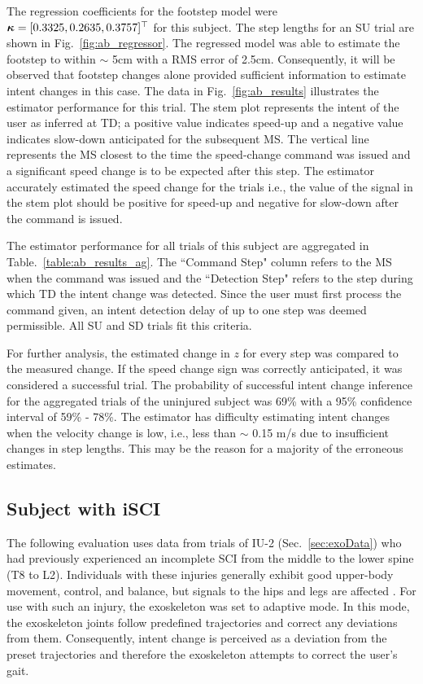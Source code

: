 The regression coefficients for the footstep model were $ \boldsymbol{\kappa} = [0.3325 ,0.2635 ,0.3757]^{\top} $ for this subject. The step lengths for an SU trial are shown in Fig.~\ref{fig:ab_regressor}. The regressed model was able to estimate the footstep to within $ \sim $ 5cm with a RMS error of 2.5cm. Consequently, it will be observed that footstep changes alone provided sufficient information to estimate intent changes in this case. The data in Fig.~\ref{fig:ab_results} illustrates the estimator performance for this trial. The stem plot represents the intent of the user as inferred at TD; a positive value indicates speed-up and a negative value indicates slow-down anticipated for the subsequent MS. The vertical line represents the MS closest to the time the speed-change command was issued and a significant speed change is to be expected after this step. The estimator accurately estimated the speed change for the trials i.e., the value of the signal in the stem plot should be positive for speed-up and negative for slow-down after the command is issued.

The estimator performance for all trials of this subject are aggregated in Table.~\ref{table:ab_results_ag}. The ``Command Step" column refers to the MS when the command was issued and the ``Detection Step" refers to the step during which TD the intent change was detected. Since the user must first process the command given, an intent detection delay of up to one step was deemed permissible. All SU and SD trials fit this criteria. 
		
For further analysis, the estimated change in $ z $ for every step was compared to the measured change. If the speed change sign was correctly anticipated, it was considered a successful trial. The probability of successful intent change inference for the aggregated trials of the uninjured subject was 69\% with a 95\% confidence interval \cite{brown2001interval} of 59\% - 78\%. The estimator has difficulty estimating intent changes when the velocity change is low, i.e., less than $ \sim $ 0.15 m/s due to insufficient changes in step lengths. This may be the reason for a majority of the erroneous estimates.
%
%
%

\subsection{Subject with iSCI}

The following evaluation uses data from trials of IU-2 (Sec.~\ref{sec:exoData}) who had previously experienced an incomplete SCI from the middle to the lower spine (T8 to L2). Individuals with these injuries generally exhibit good upper-body movement, control, and balance, but signals to the hips and legs are affected \cite{reevespinal}. %
For use with such an injury, the exoskeleton was set to adaptive mode. In this mode, the exoskeleton joints follow predefined trajectories and correct any deviations from them. Consequently, intent change is perceived as a deviation from the preset trajectories and therefore the exoskeleton attempts to correct the user's gait. 

